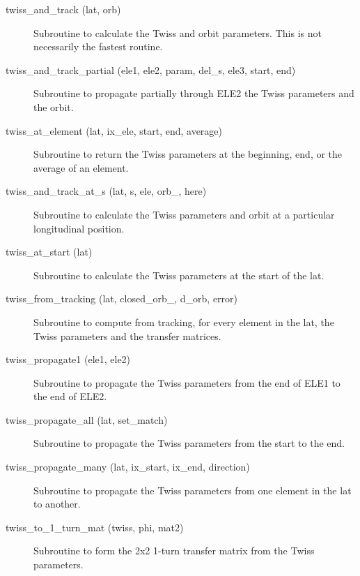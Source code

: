 \begin{description}
\label{r:twiss.and.track}
\item[twiss_and_track (lat, orb)] \Newline
Subroutine to calculate the Twiss and orbit parameters. 
This is not necessarily the fastest routine. 

\label{r:twiss.and.track.partial}
\item[twiss_and_track_partial (ele1, ele2, param, del_s, ele3, start, end)] \Newline
Subroutine to propagate partially through ELE2 the Twiss parameters and the orbit. 

\label{r:twiss.at.element}
\item[twiss_at_element (lat, ix_ele, start, end, average)] \Newline
Subroutine to return the Twiss parameters at the beginning, end, or the average of an element. 

\label{r:twiss.and.track.at.s}
\item[twiss_and_track_at_s (lat, s, ele, orb_, here)] \Newline
Subroutine to calculate the Twiss parameters and orbit at a particular longitudinal position. 

\label{r:twiss.at.start}
\item[twiss_at_start (lat)] \Newline
Subroutine to calculate the Twiss parameters at the start of the lat. 

\label{r:twiss.from.tracking}
\item[twiss_from_tracking (lat, closed_orb_, d_orb, error)] \Newline
Subroutine to compute from tracking, for every element in the lat, 
the Twiss parameters and the transfer matrices. 

\label{r:twiss.propagate1}
\item[twiss_propagate1 (ele1, ele2)] \Newline
Subroutine to propagate the Twiss parameters from the end of ELE1 to the end of ELE2. 

\label{r:twiss.propagate.all}
\item[twiss_propagate_all (lat, set_match)] \Newline
Subroutine to propagate the Twiss parameters from the start to the end. 

\label{r:twiss.propagate.many}
\item[twiss_propagate_many (lat, ix_start, ix_end, direction)] \Newline
Subroutine to propagate the Twiss parameters from one element in the lat to another. 

\label{r:twiss.to.1.turn.mat}
\item[twiss_to_1_turn_mat (twiss, phi, mat2)] \Newline
Subroutine to form the 2x2 1-turn transfer matrix from the Twiss parameters. 

\end{description}

